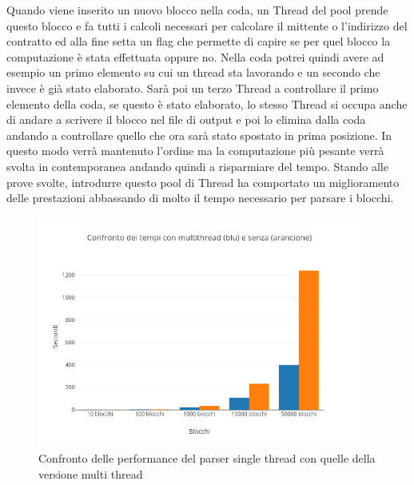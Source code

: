 \documentclass[12pt]{report}
\begin{document}
Quando viene inserito un nuovo blocco nella coda, un Thread del pool prende questo blocco e fa tutti i calcoli necessari per calcolare il mittente o l'indirizzo del contratto ed alla fine setta un flag che permette di capire se per quel blocco la computazione è stata effettuata oppure no.
Nella coda potrei quindi avere ad esempio un primo elemento su cui un thread sta lavorando e un secondo che invece è già stato elaborato.
Sarà poi un terzo Thread a controllare il primo elemento della coda, se questo è stato elaborato, lo stesso Thread si occupa anche di andare a scrivere il blocco nel file di output e poi lo elimina dalla coda andando a controllare quello che ora sarà stato spostato in prima posizione.
In questo modo verrà mantenuto l'ordine ma la computazione più pesante verrà svolta in contemporanea andando quindi a risparmiare del tempo.
Stando alle prove svolte, introdurre questo pool di Thread ha comportato un miglioramento delle prestazioni abbassando di molto il tempo necessario per parsare i blocchi.

\begin{figure}[H]
    \includegraphics[width=0.95\textwidth]{Plot2.jpg}
    \caption{Confronto delle performance del parser single thread con quelle della versione multi thread}
\end{figure}
\end{document}
